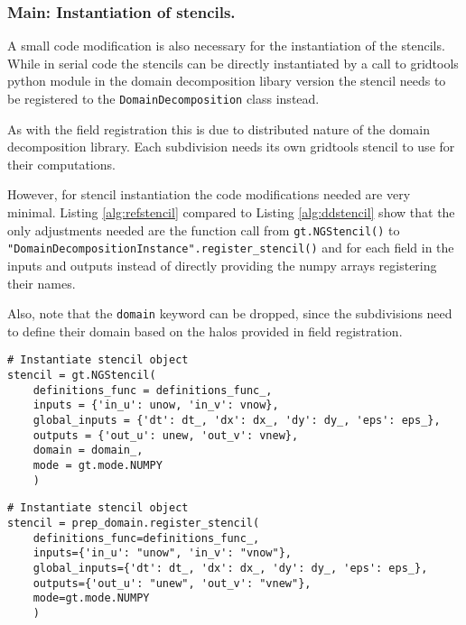 \subsubsection{Main: Instantiation of stencils.}
A small code modification is also necessary for the instantiation of the stencils.
While in serial code the stencils can be directly instantiated by a call to gridtools python module in the domain decomposition libary version the stencil needs to be registered to the \texttt{DomainDecomposition} class instead.

As with the field registration this is due to distributed nature of the domain decomposition library.
Each subdivision needs its own gridtools stencil to use for their computations.

However, for stencil instantiation the code modifications needed are very minimal.
Listing \ref{alg:refstencil} compared to Listing \ref{alg:ddstencil} show that the only adjustments needed are the function call from \texttt{gt.NGStencil()} to \texttt{"DomainDecompositionInstance".register\_stencil()} and for each field in the inputs and outputs instead of directly providing the numpy arrays registering their names.

Also, note that the \texttt{domain} keyword can be dropped, since the subdivisions need to define their domain based on the halos provided in field registration.

\begin{lstlisting}[caption={Example code for the original user stencil instantiation.},captionpos=b, label={alg:refstencil}, float, floatplacement=H]
# Instantiate stencil object
stencil = gt.NGStencil(
    definitions_func = definitions_func_,
    inputs = {'in_u': unow, 'in_v': vnow},
    global_inputs = {'dt': dt_, 'dx': dx_, 'dy': dy_, 'eps': eps_},
    outputs = {'out_u': unew, 'out_v': vnew},
    domain = domain_,
    mode = gt.mode.NUMPY
    )
\end{lstlisting}

\begin{lstlisting}[caption={Example code for the same stencil instantiation using the domain decomposition library.},captionpos=b, label={alg:ddstencil}, float, floatplacement=H]
# Instantiate stencil object
stencil = prep_domain.register_stencil(
    definitions_func=definitions_func_,
    inputs={'in_u': "unow", 'in_v': "vnow"},
    global_inputs={'dt': dt_, 'dx': dx_, 'dy': dy_, 'eps': eps_},
    outputs={'out_u': "unew", 'out_v': "vnew"},
    mode=gt.mode.NUMPY
    )
\end{lstlisting}

